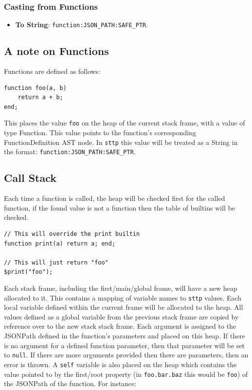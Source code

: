 \documentclass[]{full}
\theoremstyle{definition}
\begin{document}
\subsubsection{Casting from Functions}

\begin{itemize}
    \item \textbf{To String}: \verb|function:JSON_PATH:SAFE_PTR|.
\end{itemize}

\subsection{A note on Functions}

Functions are defined as follows:

\begin{verbatim}
function foo(a, b)
    return a + b;
end;
\end{verbatim}

This places the value \verb|foo| on the heap of the current stack frame, with a value of type Function. This value points to the function's corresponding FunctionDefinition AST node. In \verb|sttp| this value will be treated as a String in the format: \verb|function:JSON_PATH:SAFE_PTR|.

\subsection{Call Stack}
\label{sec:function-call-stack}

Each time a function is called, the heap will be checked first for the called function, if the found value is not a function then the table of builtins will be checked.

\begin{verbatim}
// This will override the print builtin
function print(a) return a; end;

// This will just return "foo"
$print("foo");
\end{verbatim}

Each stack frame, including the first/main/global frame, will have a new heap allocated to it. This contains a mapping of variable names to \verb|sttp| values. Each local variable defined within the current frame will be allocated to the heap. All values defined as a global variable from the previous stack frame are copied by reference over to the new stack stack frame. Each argument is assigned to the JSONPath defined in the function's parameters and placed on this heap. If there is no argument for a defined function parameter, then that parameter will be set to \verb|null|. If there are more arguments provided then there are parameters, then an error is thrown. A \verb|self| variable is also placed on the heap which contains the value pointed to by the first/root property (in \verb|foo.bar.baz| this would be \verb|foo|) of the JSONPath of the function. For instance:
\end{document}
